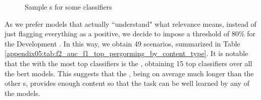 \begin{figure}[ht]
    \centering
    \hfill
    \hfill
    \caption{Sample \auc{}s for some classifiers}
    \label{fig:07_vsi_sample_auc}
\end{figure}

As we prefer models that actually ``understand" what relevance means, instead of just flagging everything as a positive, we decide to impose a threshold of 80\% for the Development \fTwo{}. In this way, we obtain 49 scenarios, summarized in Table \ref{appendix05:tab:f2_auc_f1_top_pergorming_by_content_type}. It is notable that the \contentType{} with the most top classifiers is the \trafilaturaFulltext{}, obtaining 15 top classifiers over all the \gls{bert} models. This suggests that the \trafilaturaFulltext{}, being on average much longer than the other \contentType{}s, provides enough content so that the task can be well learned by any of the models.


